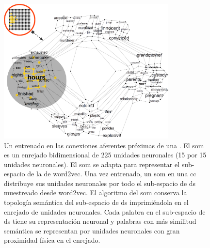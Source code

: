 {\begin{figure}[ht!]
    \centering
    \includegraphics[width=0.8\textwidth]{CorticalColumnTrainedSOM.png}
    \caption{Un  entrenado en las conexiones aferentes próximas de una . El \gls{som} es un enrejado bidimensional de 225 unidades neuronales (15 por 15 unidades neuronales). El \gls{som} se adapta para representar el sub-espacio de la  de word2vec. Una vez entrenado, un \gls{som} en una \gls{cc} distribuye sus unidades neuronales por todo el sub-espacio de \gls{ds} muestreado desde word2vec. El algoritmo del \gls{som} conserva la topología semántica del sub-espacio de \gls{ds} imprimiéndola en el enrejado de unidades neuronales. Cada palabra en el sub-espacio de \gls{ds} tiene su representación neuronal y palabras con más similitud semántica  se representan por unidades neuronales con gran proximidad física en el enrejado.}
    \label{fig:CorticalColumnTrainedSOM}
\end{figure}

}

